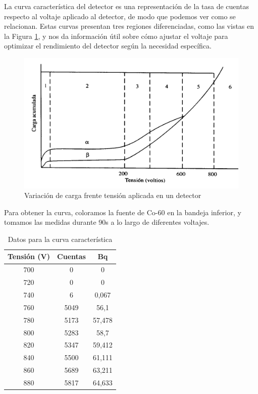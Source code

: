 \documentclass[a4paper,12pt,spanish]{article}
\begin{document}
	La curva característica del detector es una representación de la tasa de cuentas respecto al voltaje aplicado al detector, de modo que podemos ver como se relacionan. Estas curvas presentan tres regiones diferenciadas, como las vistas en la Figura \ref{fig:grafica0}, y nos da información útil sobre cómo ajustar el voltaje para optimizar el rendimiento del detector según la necesidad específica.
	
	\begin{figure}[H]
		\centering
		\includegraphics[width=0.6\linewidth]{imagenes/grafica0}
		\caption{Variación de carga frente tensión aplicada en un detector}
		\label{fig:grafica0}
	\end{figure}
	
	
	Para obtener la curva, coloramos la fuente de Co-60 en la bandeja inferior, y tomamos las medidas durante 90s a lo largo de diferentes voltajes. 
	
	
	\begin{table}[H]
		\centering
		\begin{tabular}{|c|c|c|}
			\hline
			Tensión (V) & Cuentas & Bq     \\ \hline
			700         & 0       & 0      \\ \hline
			720         & 0       & 0      \\ \hline
			740         & 6       & 0,067  \\ \hline
			760         & 5049    & 56,1   \\ \hline
			780         & 5173    & 57,478 \\ \hline
			800         & 5283    & 58,7   \\ \hline
			820         & 5347    & 59,412 \\ \hline
			840         & 5500    & 61,111 \\ \hline
			860         & 5689    & 63,211 \\ \hline
			880         & 5817    & 64,633 \\ \hline
		\end{tabular}
		\caption{Datos para la curva característica}
		\label{tab:my-table}
	\end{table}
	
\end{document}
